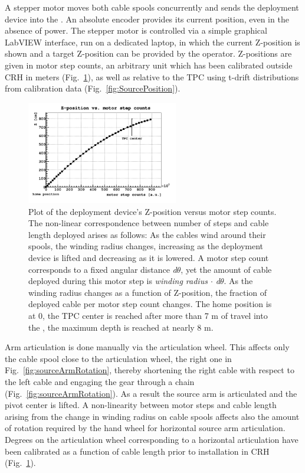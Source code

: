 A stepper motor moves both cable spools concurrently and sends the deployment device into the \lsv. An absolute encoder provides its current position, even in the absence of power. The stepper motor is controlled via a simple graphical LabVIEW interface, run on a dedicated laptop, in which the current Z-position is shown and a target Z-position can be provided by the operator. Z-positions are given in motor step counts, an arbitrary unit which has been calibrated outside CRH in meters (Fig.~\ref{fig:z_test}), as well as relative to the TPC using t-drift distributions from calibration data (Fig.~\ref{fig:SourcePosition}).

\begin{figure}[htbp]
 \centering
 \includegraphics[width=0.59\textwidth]{Figures/MSC_Z}
 \caption{Plot of the deployment device's Z-position versus motor step counts. The non-linear correspondence between number of steps and cable length deployed arises as follows: As the cables wind around their spools, the winding radius changes, increasing as the deployment device is lifted and decreasing as it is lowered. A motor step count corresponds to a fixed angular distance \textit{d$\theta$}, yet the amount of cable deployed during this motor step is \textit{winding radius $\cdot$ d$\theta$}. As the winding radius changes as a function of Z-position, the fraction of deployed cable per motor step count changes. The home position is at 0, the TPC center is reached after more than 7 m of travel into the \lsv, the maximum depth is reached at nearly 8 m.}
 \label{fig:z_test}
\end{figure}

\label{sec:Nonlinearity:MotorStepCounts}
Arm articulation is done manually via the articulation wheel. This affects only the cable spool close to the articulation wheel, the right one in Fig.~\ref{fig:sourceArmRotation}, thereby shortening the right cable with respect to the left cable and engaging the gear through a chain (Fig.~\ref{fig:sourceArmRotation}). As a result the source arm is articulated and the pivot center is lifted. A non-linearity between motor steps and cable length arising from the change in winding radius on cable spools affects also the amount of rotation required by the hand wheel for horizontal source arm articulation.
Degrees on the articulation wheel corresponding to a horizontal articulation have been calibrated as a function of cable length prior to installation in CRH (Fig.~\ref{fig:z_test}).

